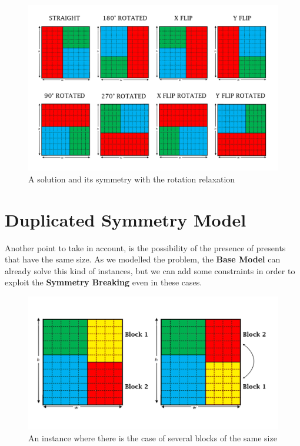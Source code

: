 \begin{figure}[ht]
	\centering
	\includegraphics[width=\textwidth]{images/rotated_simmetry.png}
	\caption{A solution and its symmetry with the rotation relaxation}
	\label{fig:overlaps}
\end{figure}



\newpage
\section{Duplicated Symmetry Model}
Another point to take in account, is the possibility of the presence of presents that have the same size. As we modelled the problem,
the \textbf{Base Model} can already solve this kind of instances, but we can add some constraints in order to exploit the \textbf{Symmetry Breaking}
even in these cases.

\begin{figure}[ht]
	\centering
	\includegraphics[width=\textwidth]{images/duplicated_problem.png}
	\caption{An instance where there is the case of several blocks of the same size}
	\label{fig:overlaps}
\end{figure}

